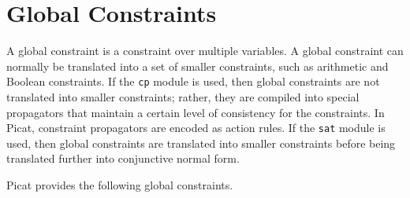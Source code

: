 \section{Global Constraints}
A global constraint is a constraint over multiple variables. A global constraint can normally be translated into a set of smaller constraints, such as arithmetic and Boolean constraints. If the \texttt{cp} module is used, then global constraints are not translated into smaller constraints; rather, they are compiled into special propagators that maintain a certain level of consistency for the constraints. In Picat, constraint propagators are encoded as action rules. If the \texttt{sat} module is used, then global constraints are translated into smaller constraints before being translated further into conjunctive normal form.

Picat provides the following global constraints.

